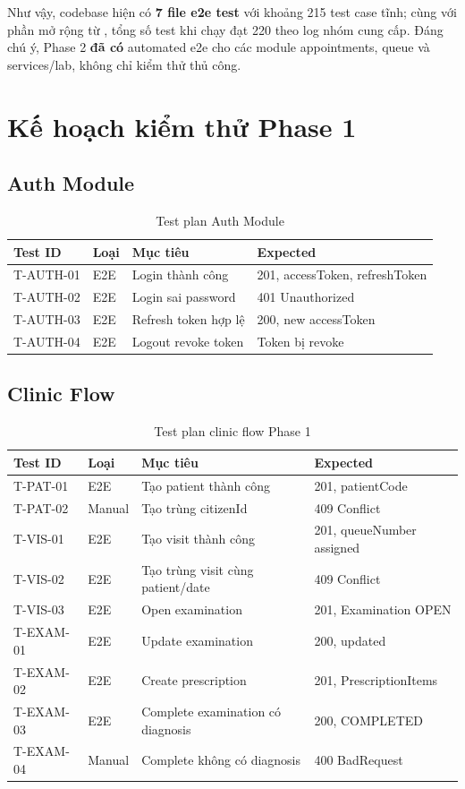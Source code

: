 Như vậy, codebase hiện có \textbf{7 file e2e test} với khoảng 215 test case tĩnh; cùng với phần mở rộng từ , tổng số test khi chạy đạt 220 theo log nhóm cung cấp. Đáng chú ý, Phase 2 \textbf{đã có} automated e2e cho các module appointments, queue và services/lab, không chỉ kiểm thử thủ công.

\section{Kế hoạch kiểm thử Phase 1}

\subsection{Auth Module}

\begin{table}[H]
\centering
\caption{Test plan Auth Module}
\begin{tabularx}{\textwidth}{|p{2.5cm}|p{2.2cm}|X|p{3.5cm}|}
\hline
\textbf{Test ID} & \textbf{Loại} & \textbf{Mục tiêu} & \textbf{Expected} \\
\hline
T-AUTH-01 & E2E & Login thành công & 201, accessToken, refreshToken \\
\hline
T-AUTH-02 & E2E & Login sai password & 401 Unauthorized \\
\hline
T-AUTH-03 & E2E & Refresh token hợp lệ & 200, new accessToken \\
\hline
T-AUTH-04 & E2E & Logout revoke token & Token bị revoke \\
\hline
\end{tabularx}
\end{table}

\subsection{Clinic Flow}

\begin{longtable}{|p{2.5cm}|p{2.2cm}|p{5cm}|p{4.5cm}|}
\caption{Test plan clinic flow Phase 1}\\
\hline
\textbf{Test ID} & \textbf{Loại} & \textbf{Mục tiêu} & \textbf{Expected} \\
\hline
T-PAT-01 & E2E & Tạo patient thành công & 201, patientCode \\
\hline
T-PAT-02 & Manual & Tạo trùng citizenId & 409 Conflict \\
\hline
T-VIS-01 & E2E & Tạo visit thành công & 201, queueNumber assigned \\
\hline
T-VIS-02 & E2E & Tạo trùng visit cùng patient/date & 409 Conflict \\
\hline
T-VIS-03 & E2E & Open examination & 201, Examination OPEN \\
\hline
T-EXAM-01 & E2E & Update examination & 200, updated \\
\hline
T-EXAM-02 & E2E & Create prescription & 201, PrescriptionItems \\
\hline
T-EXAM-03 & E2E & Complete examination có diagnosis & 200, COMPLETED \\
\hline
T-EXAM-04 & Manual & Complete không có diagnosis & 400 BadRequest \\
\hline
\end{longtable}

